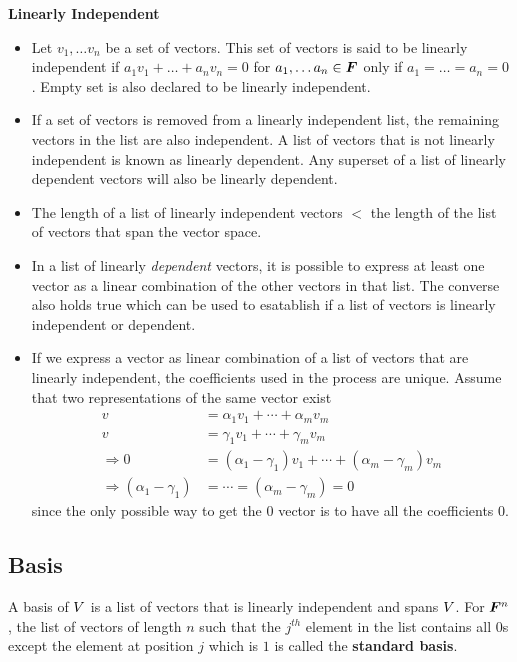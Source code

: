 \documentclass[../../linear_algebra.tex]{subfiles}
\begin{document}
\textbf{Linearly Independent}\newline
\begin{itemize}
    \item Let $v_{1}, \ldots v_{n}$ be a set of vectors. This set of vectors is said to be linearly independent if $a_{1}v_{1} + \ldots + a_{n}v_{n} = 0$ for $a_{1}, \ldots a_{n} \in \bm{F}$ only if $a_{1} = \ldots = a_{n} = 0$. Empty set is also declared to be linearly independent.
    \item If a set of vectors is removed from a linearly independent list, the remaining vectors in the list are also independent. A list of vectors that is not linearly independent is known as linearly dependent. Any superset of a list of linearly dependent vectors will also be linearly dependent.
    \item The length of a list of linearly independent vectors $<$ the length of the list of vectors that span the vector space.
    \item In a list of linearly \emph{dependent} vectors, it is possible to express at least one vector as a linear combination of the other vectors in that list. The converse also holds true which can be used to esatablish if a list of vectors is linearly independent or dependent.
    \item If we express a vector as linear combination of a list of vectors that are linearly independent, the coefficients used in the process are unique. Assume that two representations of the same vector exist
    \begin{align*}
        v &= \alpha_{1}v_{1} + \cdots + \alpha_{m}v_{m}\\
        v &= \gamma_{1}v_{1} + \cdots + \gamma_{m}v_{m}\\
        \Rightarrow 0 &= (\alpha_{1} - \gamma_{1})v_{1} + \cdots + (\alpha_{m} - \gamma_{m})v_{m}\\
        \Rightarrow (\alpha_{1} - \gamma_{1}) &= \cdots = (\alpha_{m} - \gamma_{m}) = 0
    \end{align*}
    since the only possible way to get the $0$ vector is to have all the coefficients $0$.
\end{itemize}

\subsection{Basis}
A basis of $V$ is a list of vectors that is linearly independent and spans $V$. For $\bm{F}^{n}$, the list of vectors of length $n$ such that the $j^{th}$ element in the list contains all $0$s except the element at position $j$ which is $1$ is called the \textbf{standard basis}.\newline
\end{document}
